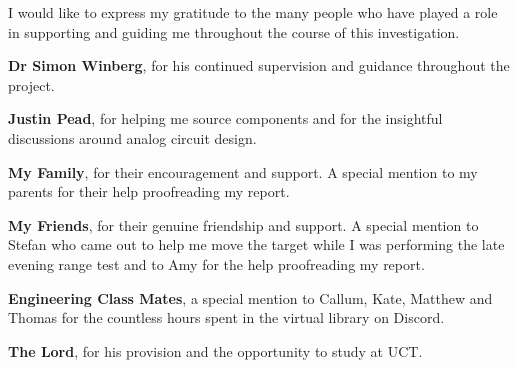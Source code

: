 I would like to express my gratitude to the many people who have played a role in supporting and guiding me throughout the course of this investigation.


\textbf{Dr Simon Winberg}, for his continued supervision and guidance throughout the project.

\textbf{Justin Pead}, for helping me source components and for the insightful discussions around analog circuit design.

\textbf{My Family}, for their encouragement and support. A special mention to my parents for their help proofreading my report.

\textbf{My Friends}, for their genuine friendship and support. A special mention to Stefan who came out to help me move the target while I was performing the late evening range test and to Amy for the help proofreading my report.

\textbf{Engineering Class Mates}, a special mention to Callum, Kate, Matthew and Thomas for the countless hours spent in the virtual library on Discord.

\textbf{The Lord}, for his provision and the opportunity to study at UCT.

